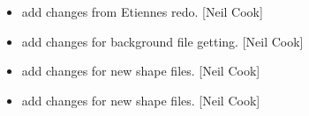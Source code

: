 \documentclass[a4paper,10pt,english]{report}
\begin{document}
\begin{itemize}
\item {} 
 \sphinxhyphen{} add changes from Etiennes redo. {[}Neil Cook{]}

\item {} 
 \sphinxhyphen{} add changes for background file getting. {[}Neil
Cook{]}

\item {} 
 \sphinxhyphen{} add changes for new shape files. {[}Neil Cook{]}

\item {} 
 \sphinxhyphen{} add changes for new shape files. {[}Neil
Cook{]}

\end{itemize}
\end{document}
